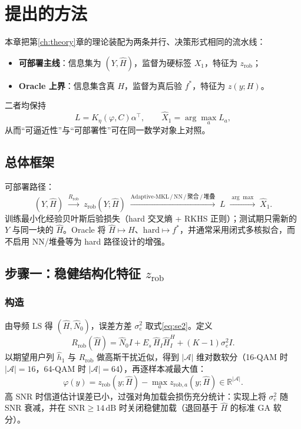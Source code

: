 \chapter{提出的方法}
\label{ch:method}

本章把第\ref{ch:theory}章的理论装配为两条并行、决策形式相同的流水线：
\begin{itemize}
  \item \textbf{可部署主线}：信息集为 $(Y,\hat H)$，监督为硬标签 $X_1$，特征为 $z_{\mathrm{rob}}$；
  \item \textbf{Oracle 上界}：信息集含真 $H$，监督为真后验 $f^*$，特征为 $z(y;H)$。
\end{itemize}
二者均保持
\[
L=K_\eta(\varphi,C)\alpha^\top,\qquad \hat X_1=\arg\max_a L_a,
\]
从而“可逼近性”与“可部署性”可在同一数学对象上对照。

\section{总体框架}

可部署路径：
\begin{equation}
(Y,\hat H)
\;\xrightarrow{R_{\mathrm{rob}}}\;
z_{\mathrm{rob}}(Y;\hat H)
\;\xrightarrow{\mathrm{Adaptive\text{-}MKL\,/\,NN\,/\,聚合\,/\,堆叠}}\;
L
\;\xrightarrow{\arg\max}\;
\hat X_1.
\label{eq:pipeline}
\end{equation}
训练最小化经验贝叶斯后验损失（hard 交叉熵 + RKHS 正则）；测试期只需新的 $Y$ 与同一块的 $\hat H$。Oracle 将 $\hat H\mapsto H$、$\mathrm{hard}\mapsto f^*$，并通常采用闭式多核拟合，而不启用 NN/堆叠等为 hard 路径设计的增强。

\section{步骤一：稳健结构化特征 $z_{\mathrm{rob}}$}

\subsection{构造}
由导频 LS 得 $(\hat H,\hat N_0)$，误差方差 $\sigma_e^2$ 取式\eqref{eq:se2}。定义
\begin{equation}
R_{\mathrm{rob}}(\hat H)
=
\hat N_0 I
+ E_s\,\hat H_I\hat H_I^H
+ (K-1)\sigma_e^2 I.
\label{eq:Rrob}
\end{equation}
以期望用户列 $\hat h_1$ 与 $R_{\mathrm{rob}}$ 做高斯干扰近似，得到 $|\mathcal{A}|$ 维对数软分（16-QAM 时 $|\mathcal{A}|=16$，64-QAM 时 $|\mathcal{A}|=64$），再逐样本减最大值：
\begin{equation}
\varphi(y)=z_{\mathrm{rob}}(y;\hat H)-\max_a z_{\mathrm{rob},a}(y;\hat H)\in\mathbb{R}^{|\mathcal{A}|}.
\label{eq:zrob-feat}
\end{equation}
高 SNR 时信道估计误差已小，过强对角加载会损伤充分统计：实现上将 $\sigma_e^2$ 随 SNR 衰减，并在 $\mathrm{SNR}\ge 14\,\mathrm{dB}$ 时关闭稳健加载（退回基于 $\hat H$ 的标准 GA 软分）。

